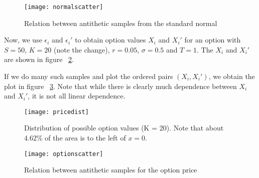 \documentclass[12pt]{article}
\begin{document}
\begin{figure}[h]
\centering
\texttt{[image: normalscatter]}
\caption{Relation between antithetic samples from the standard normal}
\label{normrelate}
\end{figure}

Now, we use $\epsilon_i$ and $\epsilon_i'$ to obtain option values $X_i$
and $X_i'$ for an option with $S = 50$, $K = 20$ (note the change), $r
= 0.05$, $\sigma = 0.5$ and $T = 1$.  The $X_i$ and $X_i'$ are shown
in figure ~\ref{pricedist}.

If we do many such samples and plot the ordered pairs $(X_i,X_i')$, we
obtain the plot in figure ~\ref{pricerelate}.  Note that while there
is clearly much dependence between $X_i$ and $X_i'$, it is not
all linear dependence.

\begin{figure}[h]
\centering
\texttt{[image: pricedist]}
\caption{Distribution of possible option values (K = 20).  Note that about
  4.62\% of the area is to the left of $x=0$.}
\label{pricedist}
\end{figure}

\begin{figure}[h]
\centering
\texttt{[image: optionscatter]}
\caption{Relation between antithetic samples for the option price}
\label{pricerelate}
\end{figure}
\end{document}
